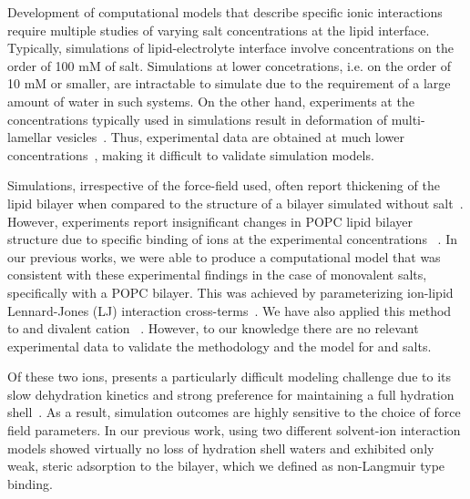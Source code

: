 Development of computational models that describe specific ionic interactions
require multiple studies of varying salt concentrations at the lipid interface.
Typically, simulations of lipid-electrolyte interface involve concentrations on the order of 100 mM of salt.
Simulations at lower concetrations, i.e. on the order of 10 mM or smaller, are intractable to simulate due to the requirement
of a large amount of water in such systems.
On the other hand, experiments at the concentrations typically used in simulations result in deformation of
multi-lamellar vesicles~\cite{kurakin:2021:effect,pabst:2007:rigidification,inoko:1975,yamada:2005}.
Thus, experimental data are obtained
at much lower concentrations~\cite{kurakin:2021:effect,kucerka:2020,kurakin:2022:cations,inoko:1975,yamada:2005}, making
it difficult to validate simulation models.

Simulations, irrespective of the force-field used, often report thickening of the lipid
bilayer when compared to the structure of a bilayer simulated without salt~\cite{Cordomi:2008,Cordomi:2009,venable:2013,yoo:2012:improved}.
However, experiments report insignificant changes in POPC lipid
bilayer structure due to specific binding of ions at the experimental concentrations
~\cite{kurakin:2021:effect,kucerka:2020,kurakin:2022:cations}.
In our previous works, we were able to produce a computational model that was consistent with these experimental findings
in the case of monovalent salts, specifically \nacl{} with a POPC bilayer.
This was achieved by parameterizing ion-lipid Lennard-Jones (LJ) interaction cross-terms~\cite{saunders:2022}.
We have also applied this method to \li{} and divalent cation \mg{}~\cite{saunders:2024}. However, to our knowledge there
are no relevant experimental data to validate the methodology and the model for \li{} and \mg{} salts.

Of these two ions, \mg{} presents a particularly difficult modeling challenge due to its slow dehydration kinetics and
strong preference for maintaining a full hydration shell~\cite{grotz:2021:optimized}. As a result,
simulation outcomes are highly sensitive to the
choice of force field parameters. %
In our previous work, \mg{} using two different solvent-ion interaction models
showed virtually no loss of hydration shell waters and exhibited only weak, steric
adsorption to the bilayer, which we defined as non-Langmuir type binding.

